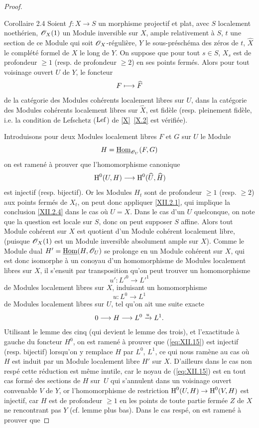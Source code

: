 \begin{proof}
\label{XII.2.4}
\begin{enonce*}{Corollaire 2.4\ndemark}
Soient $f:X\to S$ un morphisme projectif et plat, avec $S$ localement noeth\'erien, $\mathscr{O}_X(1)$ un Module inversible sur $X$, ample relativement \`a $S$, $t$ une section de ce Module qui soit $\mathscr{O}_X$-r\'eguli\`ere, $Y$ le sous-pr\'esch\'ema des z\'eros de $t$, $\widehat{X}$ le compl\'et\'e formel de $X$ le long de $Y$. On suppose que pour tout $s\in S$, $X_s$ est de profondeur $\geq 1$ (resp. de profondeur $\geq 2$) en ses points ferm\'es. Alors pour tout voisinage ouvert $U$ de $Y$, le foncteur
\[
F \mto \widehat{F}
\]
de la cat\'egorie des Modules coh\'erents localement libres sur $U$, dans la cat\'egorie des Modules coh\'erents localement libres sur $\widehat{X}$, est fid\`ele (resp. pleinement fid\`ele, i.e. la condition de Lefschetz ($\operatorname{Lef}$) de \ref{X}~\ref{X.2} est v\'erifi\'ee).
\end{enonce*}
Introduisons pour deux Modules localement libres $F$ et $G$ sur $U$ le Module
\[
H=\mathop{\underline{\mathrm{Hom}}}\nolimits_{{\mathscr O}_U}(F, G)
\]
on est ramen\'e \`a prouver que l'homomorphisme canonique
\steco
\begin{equation} \label{eq:XII.15} {}\H^0(U, H) \to \H^0(\widehat{U}, \widehat{H})
\end{equation}
est injectif (resp. bijectif). Or les Modules $H_t$ sont de profondeur $\geq 1$ (resp. $\geq 2$) aux points ferm\'es de $X_t$, on peut donc appliquer \ref{XII.2.1}, qui implique la conclusion \ref{XII.2.4} dans le cas o\`u $U=X$. Dans le cas d'un $U$ quelconque, on note que la question est locale sur $S$, donc on peut supposer $S$ affine. Alors tout Module coh\'erent sur $X$ est quotient d'un Module coh\'erent localement libre, (puisque $\mathscr{O}_X(1)$ est un Module inversible absolument ample sur $X$). Comme le Module dual $H'=\mathop{\underline{\mathrm{Hom}}}\nolimits(H, {\mathscr O}_U)$ se prolonge en un Module coh\'erent sur $X$, qui est donc isomorphe \`a un conoyau d'un homomorphisme de Modules localement libres sur $X$, il s'ensuit par transposition qu'on peut trouver un homomorphisme
\[
u':{L'}^0 \to {L'}^1
\]
de Modules localement libres sur $X$, induisant un homomorphisme
\[
u:L^0 \to L^1
\]
de Modules localement libres sur $U$, tel qu'on ait une suite exacte
\[
0\to H \to L^0 \lto{u} L^1.
\]
Utilisant le lemme des cinq (qui devient le lemme des trois), et l'exactitude \`a gauche du foncteur $H^0$, on est ramen\'e \`a prouver que (\ref{eq:XII.15}) est injectif (resp. bijectif) lorsqu'on y remplace $H$ par $L^0$, $L^1$, ce qui nous ram\`ene au cas o\`u $H$ est induit par un Module localement libre $H'$ sur $X$. D'ailleurs dans le cas non resp\'e cette r\'eduction est m\^eme inutile, car le noyau de (\ref{eq:XII.15}) est en tout cas form\'e des sections de $H$ sur~$U$ qui s'annulent dans un voisinage ouvert convenable $V$ de $Y$, or l'homomorphisme de restriction $\H^0(U, H)\to\H^0(V, H)$ est injectif, car $H$ est de profondeur $\geq 1$ en les points de toute partie ferm\'ee $Z$ de $X$ ne rencontrant pas $Y$ (cf. lemme plus bas). Dans le cas resp\'e, on est ramen\'e \`a prouver que

\end{proof}
